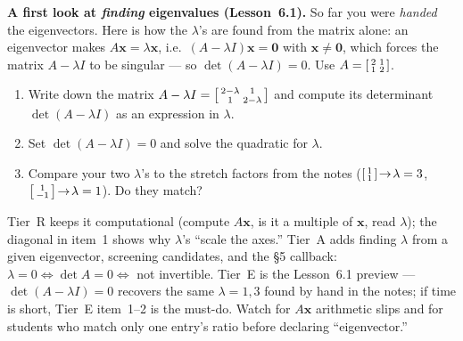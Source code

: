 \documentclass[10pt]{article}
\newcommand{\xx}{\mathbf{x}}
\newcommand{\zero}{\mathbf{0}}
\begin{document}
\begin{tcolorbox}[colback=white, colframe=black!40, title=\textbf{Tier E --- Extension},
    fonttitle=\bfseries, arc=1.5mm, left=3mm, right=3mm, top=2mm, bottom=2mm, breakable]
\textbf{A first look at \emph{finding} eigenvalues (Lesson~6.1).} So far you were \emph{handed} the
eigenvectors. Here is how the $\lambda$'s are found from the matrix alone: an eigenvector makes
$A\xx=\lambda\xx$, i.e.\ $(A-\lambda I)\xx=\zero$ with $\xx\ne\zero$, which forces the matrix
$A-\lambda I$ to be singular --- so $\det(A-\lambda I)=0$. Use $A=\begin{bsmallmatrix} 2 & 1\\ 1 & 2 \end{bsmallmatrix}$.
\begin{enumerate}[leftmargin=1.7em, itemsep=9pt]
  \item Write down the matrix $A-\lambda I=\begin{bsmallmatrix} 2-\lambda & 1\\ 1 & 2-\lambda \end{bsmallmatrix}$
        and compute its determinant $\det(A-\lambda I)$ as an expression in $\lambda$.
  \item Set $\det(A-\lambda I)=0$ and solve the quadratic for $\lambda$.
  \item Compare your two $\lambda$'s to the stretch factors from the notes
        ($\begin{bsmallmatrix} 1\\ 1 \end{bsmallmatrix}\!\to\!\lambda=3$,
        $\begin{bsmallmatrix} 1\\ -1 \end{bsmallmatrix}\!\to\!\lambda=1$). Do they match?
\end{enumerate}
\end{tcolorbox}

\begin{teachernote}
Tier~R keeps it computational (compute $A\xx$, is it a multiple of $\xx$, read $\lambda$); the diagonal
in item~1 shows why $\lambda$'s ``scale the axes.'' Tier~A adds finding $\lambda$ from a given
eigenvector, screening candidates, and the §5 callback: $\lambda=0\Leftrightarrow\det A=0\Leftrightarrow$
not invertible. Tier~E is the Lesson~6.1 preview --- $\det(A-\lambda I)=0$ recovers the same $\lambda=1,3$
found by hand in the notes; if time is short, Tier~E item~1--2 is the must-do. Watch for $A\xx$
arithmetic slips and for students who match only one entry's ratio before declaring ``eigenvector.''
\end{teachernote}
\end{document}
